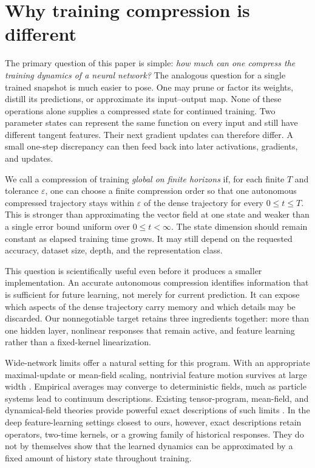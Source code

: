 \section{Why training compression is different}
\label{sec:introduction}

The primary question of this paper is simple:
\emph{how much can one compress the training dynamics of a neural network?}
The analogous question for a single trained snapshot is much easier to pose.
One may prune or factor its weights, distill its predictions, or approximate
its input--output map.  None of these operations alone supplies a compressed
state for continued training.  Two parameter states can represent the same
function on every input and still have different tangent features.  Their
next gradient updates can therefore differ.  A small one-step discrepancy can
then feed back into later activations, gradients, and updates.

We call a compression of training \emph{global on finite horizons} if, for
each finite $T$ and tolerance $\varepsilon$, one can choose a finite
compression order so that one autonomous compressed trajectory stays within
$\varepsilon$ of the dense trajectory for every $0\le t\le T$.  This is
stronger than approximating the vector field at one state and weaker than a
single error bound uniform over $0\le t<\infty$.  The state dimension should
remain constant as elapsed training time grows.  It may still depend on the
requested accuracy, dataset size, depth, and the representation class.

This question is scientifically useful even before it produces a smaller
implementation.  An accurate autonomous compression identifies information
that is sufficient for future learning, not merely for current prediction.
It can expose which aspects of the dense trajectory carry memory and which
details may be discarded.  Our nonnegotiable target retains three ingredients
together: more than one hidden layer, nonlinear responses that remain active,
and feature learning rather than a fixed-kernel linearization.

Wide-network limits offer a natural setting for this program.  With an
appropriate maximal-update or mean-field scaling, nontrivial feature motion
survives at large width \citep{yang2021tensor,nguyen2023rigorous}.  Empirical
averages may converge to deterministic fields, much as particle systems lead
to continuum descriptions.  Existing tensor-program, mean-field, and
dynamical-field theories provide powerful exact descriptions of such limits
\citep{yang2021tensor,nguyen2023rigorous,bordelon2022selfconsistent}.  In the
deep feature-learning settings closest to ours, however, exact descriptions
retain operators, two-time kernels, or a growing family of historical
responses.  They do not by themselves show that the learned dynamics can be
approximated by a fixed amount of history state throughout training.

